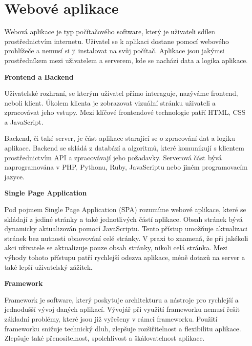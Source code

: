 \section{Webové aplikace}

\begin{zvyraznenyodstavec}
Webová aplikace je typ počítačového software, který je uživateli sdílen prostřednictvím internetu. 
Uživatel se k aplikaci dostane pomocí webového prohlížeče a nemusí si ji instalovat na svůj počítač. 
Aplikace jsou jakýmsi prostředníkem mezi uživatelem a serverem, kde se nachází data a logika aplikace.\cite{codeacademywebapp}

\begin{flushleft}
  \textbf{Frontend a Backend}
\end{flushleft}

Uživatelské rozhraní, se kterým uživatel přímo interaguje, nazýváme frontend, neboli klient.
Úkolem klienta je zobrazovat vizuální stránku uživateli a zpracovávat jeho vstupy. 
Mezi klíčové frontendové technologie patří HTML, CSS a JavaScript.

Backend, či také server, je část aplikace starající se o zpracování dat a logiku aplikace. 
Backend se skládá z databází a algoritmů, které komunikují s klientem prostřednictvím API a zpracovávají jeho požadavky. 
Serverová část bývá naprogramována v PHP, Pythonu, Ruby, JavaScriptu nebo jiném programovacím jazyce.\cite{stateofartframeworks}

\begin{flushleft}
  \textbf{Single Page Application}
\end{flushleft}

Pod pojmem Single Page Application (SPA) rozumíme webové aplikace, které se skládají z jediné stránky a také jednotlivých částí aplikace. 
Obsah stránek bývá dynamicky aktualizován pomocí JavaScriptu. Tento přístup umožňuje aktualizaci stránek bez nutnosti obnovování celé stránky. 
V praxi to znamená, že při jakékoli akci uživatele se aktualizuje pouze obsah stránky, nikoli celá stránka. 
Mezi výhody tohoto přístupu patří rychlejší odezva aplikace, méně dotazů na server a také lepší uživatelský zážitek.\cite{jadhavspa}

\begin{flushleft}
  \textbf{Framework}
\end{flushleft}

Framework je software, který poskytuje architekturu a nástroje pro rychlejší a jednodušší vývoj daných aplikací. 
Vývojář při využití frameworku nemusí řešit základní problémy, které jsou již vyřešeny v rámci frameworku. 
Použití frameworku snižuje technický dluh, zlepšuje rozšiřitelnost a flexibilitu aplikace. 
Zlepšuje také přenositelnost, spolehlivost a škálovatelnost aplikace.\cite{schmidtframeworks}
\end{zvyraznenyodstavec}
